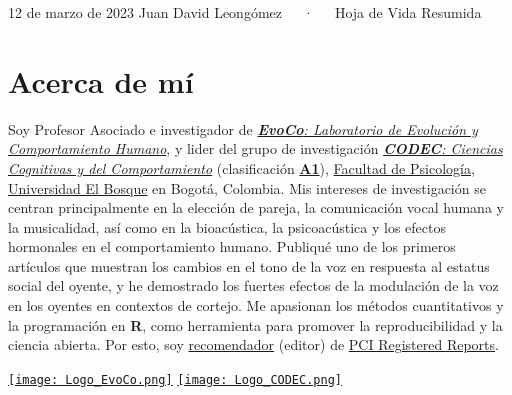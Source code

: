 \documentclass[11pt,a4paper,]{awesome-cv}
\begin{document}
\makecvheader

\makecvfooter
  {12 de marzo de 2023}
    {Juan David Leongómez~~~·~~~Hoja de Vida Resumida}
  {\thepage}





\hypertarget{acerca-de-muxed}{%
\section{Acerca de mí}\label{acerca-de-muxed}}

\begin{minipage}[c]{0.85\linewidth}
Soy Profesor Asociado e investigador de \href{https://jdleongomez.info/es/team/}{\textit{\textbf{EvoCo}: Laboratorio de Evolución y Comportamiento Humano}}, y lider del grupo de investigación \href{https://investigaciones.unbosque.edu.co/codec}{\textit{\textbf{CODEC}: Ciencias Cognitivas y del Comportamiento}} (clasificación  \href{https://scienti.minciencias.gov.co/gruplac/jsp/visualiza/visualizagr.jsp?nro=00000000001446}{\textbf{A1}}),  \href{https://www.uelbosque.edu.co/psicologia}{Facultad de Psicología}, \href{https://www.uelbosque.edu.co/}{Universidad El Bosque} en Bogotá, Colombia. Mis intereses de investigación se centran principalmente en la elección de pareja, la comunicación vocal humana y la musicalidad, así como en la bioacústica, la psicoacústica y los efectos hormonales en el comportamiento humano. Publiqué uno de los primeros artículos que muestran los cambios en el tono de la voz en respuesta al estatus social del oyente, y he demostrado los fuertes efectos de la modulación de la voz en los oyentes en contextos de cortejo. Me apasionan los métodos cuantitativos y la programación en \textbf{R}, como herramienta para promover la reproducibilidad y la ciencia abierta. Por esto, soy \href{https://rr.peercommunityin.org/about/recommenders}{recomendador} (editor) de \href{https://rr.peercommunityin.org/}{PCI Registered Reports}.
\end{minipage} \begin{minipage}[c]{0.15\linewidth}
\begin{flushright} 
\hfill \href{https://jdleongomez.info/es/team/}{\texttt{[image: Logo\_EvoCo.png]}} \newline \href{https://investigaciones.unbosque.edu.co/codec}{\texttt{[image: Logo\_CODEC.png]}}
\end{flushright}
\end{minipage}
\end{document}
